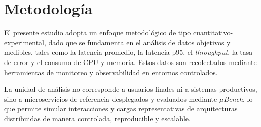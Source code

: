 \chapter{Metodología}

El presente estudio adopta un enfoque metodológico de tipo cuantitativo-experimental, dado que se fundamenta en el análisis de datos objetivos y medibles, tales como la latencia promedio, la latencia p95, el \textit{throughput}, la tasa de error y el consumo de CPU y memoria. Estos datos son recolectados mediante herramientas de monitoreo y observabilidad en entornos controlados.

La unidad de análisis no corresponde a usuarios finales ni a sistemas productivos, sino a microservicios de referencia desplegados y evaluados mediante \textit{$\mu$Bench}, lo que permite simular interacciones y cargas representativas de arquitecturas distribuidas de manera controlada, reproducible y escalable.

